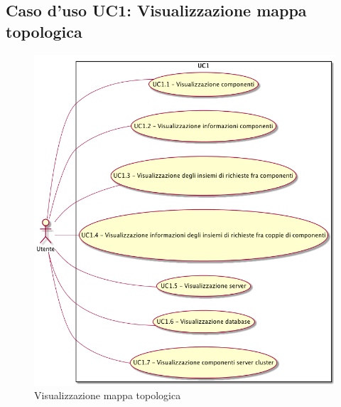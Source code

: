 \subsection{Caso d'uso UC1: Visualizzazione mappa topologica}
\begin{figure} [H]
	\centering
	\includegraphics[scale=0.45]{./UC/UC1.png}
	\caption{Visualizzazione mappa topologica}\label{}
\end{figure}
